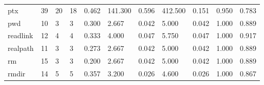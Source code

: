 \begin{longtable}{lp{1.2cm}p{1.2cm}p{1.2cm}p{1.2cm}p{1.2cm}p{1.2cm}p{1.2cm}p{1.2cm}p{1.2cm}p{1.2cm}}
ptx       &                           39 &                 20 &                                18 &                                      0.462 &                                141.300 &                                        0.596 &                           412.500 &                                   0.151 &                              0.950 &                                              0.783 \\
pwd       &                           10 &                  3 &                                 3 &                                      0.300 &                                  2.667 &                                        0.042 &                             5.000 &                                   0.042 &                              1.000 &                                              0.889 \\
readlink  &                           12 &                  4 &                                 4 &                                      0.333 &                                  4.000 &                                        0.047 &                             5.750 &                                   0.047 &                              1.000 &                                              0.917 \\
realpath  &                           11 &                  3 &                                 3 &                                      0.273 &                                  2.667 &                                        0.042 &                             5.000 &                                   0.042 &                              1.000 &                                              0.889 \\
rm        &                           15 &                  3 &                                 3 &                                      0.200 &                                  2.667 &                                        0.042 &                             5.000 &                                   0.042 &                              1.000 &                                              0.889 \\
rmdir     &                           14 &                  5 &                                 5 &                                      0.357 &                                  3.200 &                                        0.026 &                             4.600 &                                   0.026 &                              1.000 &                                              0.867 \\

\end{longtable}
